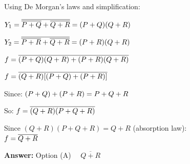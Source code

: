 \documentclass[12pt,a4paper]{article}
\begin{document}
Using De Morgan's laws and simplification:

$
Y_1 = \overline{\overline{P+Q} + \overline{Q+R}} 
     = (P+Q)(Q+R)\\
$

$
Y_2 = \overline{\overline{P+R} + \overline{Q+R}} 
     = (P+R)(Q+R)\\
$

$
f = \overline{(P+Q)(Q+R) + (P+R)(Q+R)}\\
$

$
f = \overline{(Q+R)[(P+Q) + (P+R)]}\\
$

Since:
$
(P+Q) + (P+R) = P + Q + R\\
$

So:
$
f = \overline{(Q+R)(P+Q+R)}\\
$

Since $(Q+R)(P+Q+R) = Q+R$ (absorption law):\\

 $f = \overline{Q+R}\\$

\noindent
\textbf{Answer:} Option (A) $\quad \boxed{\overline{Q+R}}$
\end{document}
